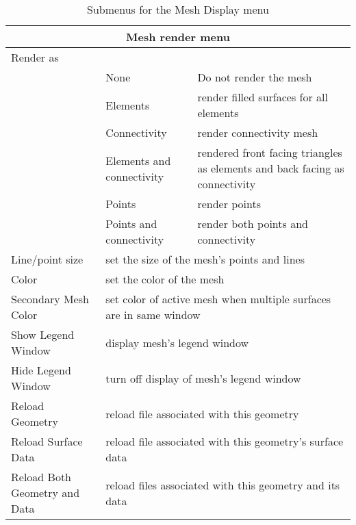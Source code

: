 \begin{table}[ht]
  \begin{center}
    \begin{tabular}{|p{1in}|p{2in}|p{2.5in}|} \hline
      \multicolumn{3}{|c|}{\textbf{Mesh render menu}} \\ \hline
    Render as & & \\
      &  None & Do not render the mesh \\
      &  Elements  & render filled surfaces for all elements \\
      &  Connectivity & render connectivity mesh\\ 
      &  Elements and connectivity & rendered front facing triangles as
            elements and back facing as connectivity \\ 
      &  Points & render points \\ 
      &  Points and connectivity & render both points and connectivity \\ 
      \hline
    Line/point size 
      & \multicolumn{2}{|l|}{set the size of the mesh's points and lines}\\
    \hline 
    Color 
      & \multicolumn{2}{|l|}{set the color of the mesh}\\ \hline
    Secondary Mesh Color
      & \multicolumn{2}{|l|}{set color of active mesh when multiple 
        surfaces are in same window} \\ \hline
    Show Legend Window
      & \multicolumn{2}{|l|}{display mesh's legend window}\\ \hline
    Hide Legend Window
      & \multicolumn{2}{|l|}{turn off display of mesh's legend window}\\ \hline
    Reload Geometry
      & \multicolumn{2}{|l|}{reload file associated with this geometry}\\
    \hline 
    Reload Surface Data
      & \multicolumn{2}{|l|}{reload file associated with this geometry's
    surface data}\\ \hline 
    Reload Both Geometry and Data
      & \multicolumn{2}{|l|}{reload files associated with this geometry and
    its data}\\ \hline 

    \end{tabular}
  \end{center}
\caption{Submenus for the Mesh Display menu}
\end{table}

